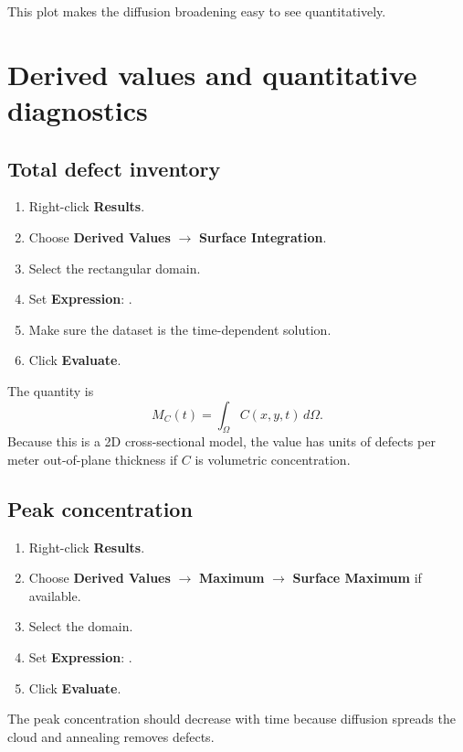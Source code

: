 \documentclass[11pt]{article}
\newcommand{\code}[1]{\texttt{\detokenize{#1}}}
\begin{document}
This plot makes the diffusion broadening easy to see quantitatively.

\section{Derived values and quantitative diagnostics}

\subsection{Total defect inventory}

\begin{enumerate}[leftmargin=2em]
\item Right-click \textbf{Results}.
\item Choose \textbf{Derived Values} $\rightarrow$ \textbf{Surface Integration}.
\item Select the rectangular domain.
\item Set \textbf{Expression}: \code{C}.
\item Make sure the dataset is the time-dependent solution.
\item Click \textbf{Evaluate}.
\end{enumerate}

The quantity is
\begin{equation}
M_C(t)=\int_{\Omega}C(x,y,t)\,d\Omega.
\end{equation}
Because this is a 2D cross-sectional model, the value has units of defects per meter out-of-plane thickness if $C$ is volumetric concentration.

\subsection{Peak concentration}

\begin{enumerate}[leftmargin=2em]
\item Right-click \textbf{Results}.
\item Choose \textbf{Derived Values} $\rightarrow$ \textbf{Maximum} $\rightarrow$ \textbf{Surface Maximum} if available.
\item Select the domain.
\item Set \textbf{Expression}: \code{C}.
\item Click \textbf{Evaluate}.
\end{enumerate}

The peak concentration should decrease with time because diffusion spreads the cloud and annealing removes defects.
\end{document}
